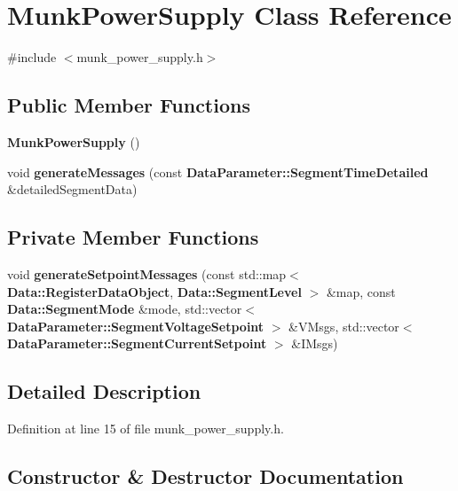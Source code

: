\section{Munk\+Power\+Supply Class Reference}
\label{class_munk_power_supply}


{\ttfamily \#include $<$munk\+\_\+power\+\_\+supply.\+h$>$}

\subsection*{Public Member Functions}
\begin{DoxyCompactItemize}
\item 
\textbf{ Munk\+Power\+Supply} ()
\item 
void \textbf{ generate\+Messages} (const \textbf{ Data\+Parameter\+::\+Segment\+Time\+Detailed} \&detailed\+Segment\+Data)
\end{DoxyCompactItemize}
\subsection*{Private Member Functions}
\begin{DoxyCompactItemize}
\item 
void \textbf{ generate\+Setpoint\+Messages} (const std\+::map$<$ \textbf{ Data\+::\+Register\+Data\+Object}, \textbf{ Data\+::\+Segment\+Level} $>$ \&map, const \textbf{ Data\+::\+Segment\+Mode} \&mode, std\+::vector$<$ \textbf{ Data\+Parameter\+::\+Segment\+Voltage\+Setpoint} $>$ \&V\+Msgs, std\+::vector$<$ \textbf{ Data\+Parameter\+::\+Segment\+Current\+Setpoint} $>$ \&I\+Msgs)
\end{DoxyCompactItemize}


\subsection{Detailed Description}


Definition at line 15 of file munk\+\_\+power\+\_\+supply.\+h.



\subsection{Constructor \& Destructor Documentation}
\mbox{\label{class_munk_power_supply_a4dbb8e589a1a7d7ecdd9c1e20be5c0b8}} 
